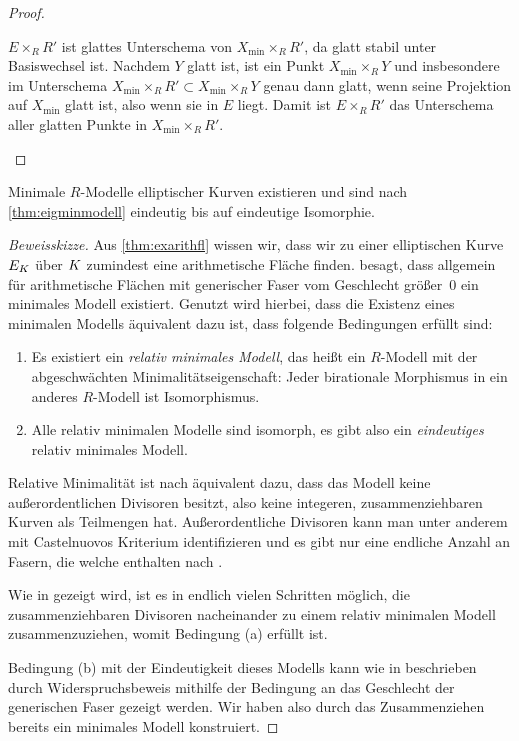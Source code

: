 \begin{Satz}
\begin{proof}
\begin{enumerate}[label=(\roman*)]
      $E\times_R R'$ ist glattes Unterschema von
      $X_{\text{min}}\times_R R'$, da glatt stabil unter Basiswechsel
      ist. Nachdem $Y$ glatt ist, ist ein Punkt 
      $X_{\text{min}}\times_R Y$ und insbesondere im Unterschema
      ${X_{\text{min}}\times_R R'}\subset {X_{\text{min}}\times_R Y}$
      genau dann glatt, wenn seine Projektion auf $X_{\text{min}}$
      glatt ist, also wenn sie in $E$ liegt. Damit ist $E\times_R R'$
      das Unterschema aller glatten Punkte in
      ${X_{\text{min}}\times_R R'}$.
    \end{enumerate}
  \end{proof}
\end{Satz}

\begin{Satz}\label{thm:exminmodell}
  Minimale $R$-Modelle elliptischer Kurven existieren und sind nach
  \ref{thm:eigminmodell} eindeutig bis auf eindeutige Isomorphie.
  \begin{proof}[Beweisskizze]
    Aus \ref{thm:exarithfl} wissen wir, dass wir zu einer elliptischen
    Kurve $E_{K}$ über $K$ zumindest eine arithmetische Fläche finden.
    \cite[Theorem 9.3.21]{liu} besagt, dass allgemein für
    arithmetische Flächen mit generischer Faser vom Geschlecht größer~0 ein
    minimales Modell existiert.
    Genutzt wird hierbei, dass die Existenz eines minimalen Modells
    äquivalent dazu ist, dass folgende Bedingungen erfüllt sind:
    \begin{enumerate}[label=(\alph*)]
    \item Es existiert ein \emph{relativ minimales Modell}, das heißt
      ein $R$-Modell mit der abgeschwächten Minimalitätseigenschaft:
      Jeder birationale Morphismus in ein anderes $R$-Modell ist
      Isomorphismus.
    \item Alle relativ minimalen Modelle sind isomorph, es gibt also
      ein \emph{eindeutiges} relativ minimales Modell.
    \end{enumerate}
    Relative Minimalität ist nach \cite[Theorem 9.2.2]{liu} äquivalent
    dazu, dass das Modell keine außerordentlichen Divisoren besitzt,
    also keine integeren, zusammenziehbaren Kurven als Teilmengen
    hat.
    Außerordentliche Divisoren kann man unter anderem mit Castelnuovos
    Kriterium \cite[Theorem 9.3.8]{liu} identifizieren und es gibt nur
    eine endliche Anzahl an Fasern, die welche enthalten nach
    \cite[Lemma 9.3.17]{liu}.

    Wie in \cite[Proposition 9.3.19]{liu} gezeigt wird, ist es in
    endlich vielen Schritten möglich, die zusammenziehbaren Divisoren
    nacheinander zu einem relativ minimalen Modell zusammenzuziehen,
    womit Bedingung (a) erfüllt ist.

    Bedingung (b) mit der Eindeutigkeit dieses Modells kann wie in
    \cite[Theorem 9.3.21]{liu} beschrieben durch Widerspruchsbeweis
    mithilfe der Bedingung an das Geschlecht der generischen Faser
    gezeigt werden.
    Wir haben also durch das Zusammenziehen bereits ein minimales
    Modell konstruiert.
  \end{proof}
\end{Satz}

